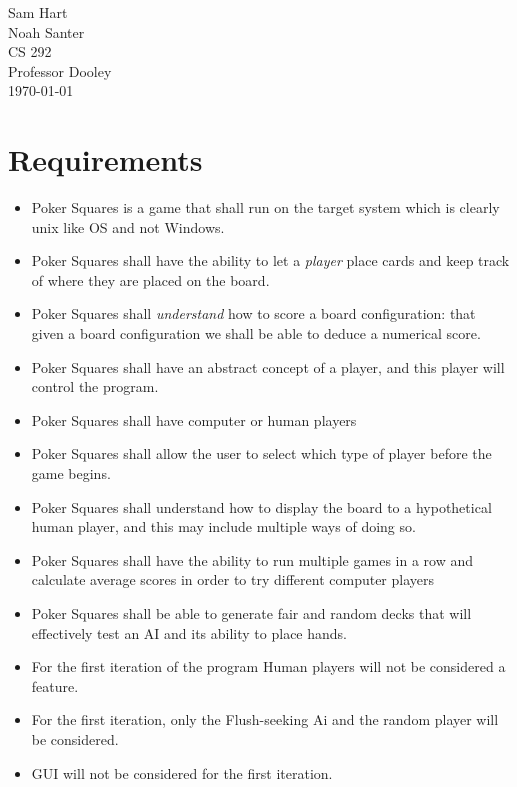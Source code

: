 \documentclass[12pt]{article}
\begin{document}
\noindent Sam Hart \\
Noah Santer \\
CS 292 \\
Professor Dooley \\
\today \\

\section{Requirements}

\begin{itemize}
\item Poker Squares is a game that shall run on the target system which is clearly unix like OS and not Windows.
\item Poker Squares shall have the ability to let a \textit{player} place cards and keep track of where they are placed on the board.
\item Poker Squares shall \textit{understand} how to score a board configuration: that given a board configuration we shall be able to deduce a numerical score.
\item Poker Squares shall have an abstract concept of a player, and this player will control the program.
\item Poker Squares shall have computer or human players
\item Poker Squares shall allow the user to select which type of player before the game begins.
\item Poker Squares shall understand how to display the board to a hypothetical human player, and this may include multiple ways of doing so.
\item Poker Squares shall have the ability to run multiple games in a row and calculate average scores in order to try different computer players
\item Poker Squares shall be able to generate fair and random decks that will effectively test an AI and its ability to place hands.
\item For the first iteration of the program Human players will not be considered a feature.
\item For the first iteration, only the Flush-seeking Ai and the random player will be considered.
\item GUI will not be considered for the first iteration.
\end{itemize}
\end{document}
